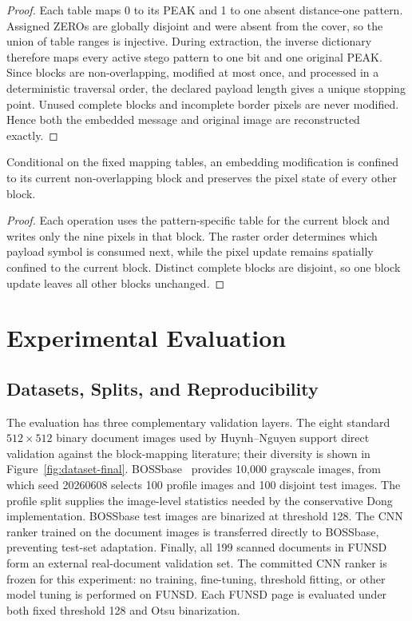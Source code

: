 \begin{proof}
Each table maps 0 to its PEAK and 1 to one absent distance-one pattern.
Assigned ZEROs are globally disjoint and were absent from the cover, so the
union of table ranges is injective. During extraction, the inverse dictionary
therefore maps every active stego pattern to one bit and one original PEAK.
Since blocks are non-overlapping, modified at most once, and processed in a
deterministic traversal order, the declared payload length gives a unique
stopping point. Unused complete blocks and incomplete border pixels are never
modified. Hence both the embedded message and original image are reconstructed
exactly.
\end{proof}

\begin{proposition}
Conditional on the fixed mapping tables, an embedding modification is confined
to its current non-overlapping block and preserves the pixel state of every
other block.
\end{proposition}

\begin{proof}
\RevisionAddBegin
Each operation uses the pattern-specific table for the current block and writes
only the nine pixels in that block. The raster order determines which payload
symbol is consumed next, while the pixel update remains spatially confined to
the current block. Distinct complete blocks are disjoint, so one block update
leaves all other blocks unchanged.
\RevisionAddEnd
\end{proof}


\section{Experimental Evaluation}
\label{sec:experimental}

\subsection{Datasets, Splits, and Reproducibility}

\RevisionAddBegin
The evaluation has three complementary validation layers. The eight standard
$512\times512$ binary document images used by Huynh--Nguyen
\cite{Huynh2025BlockMapping} support direct validation against the block-mapping
literature; their diversity is shown in Figure~\ref{fig:dataset-final}.
BOSSbase~\cite{Bas2011BOSS} provides 10,000 grayscale images, from which seed
20260608 selects 100 profile images and 100 disjoint test images. The profile
split supplies the image-level statistics needed by the conservative Dong
implementation. BOSSbase test images are binarized at threshold 128. The CNN
ranker trained on the document images is transferred directly to BOSSbase,
preventing test-set adaptation. Finally, all 199 scanned documents in FUNSD
form an external real-document validation set. The committed CNN ranker is
frozen for this experiment: no training, fine-tuning, threshold fitting, or
other model tuning is performed on FUNSD. Each FUNSD page is evaluated under
both fixed threshold 128 and Otsu binarization.

